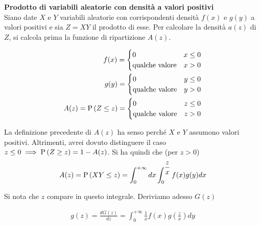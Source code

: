 \begin{defn}
    \textbf{Prodotto di variabili aleatorie con densità a valori positivi} \\
    Siano date $X$ e $Y$ variabili aleatorie con corrispondenti densità $f(x)$ e
    $g(y)$ a valori positivi e sia $Z = XY$ il prodotto di esse. Per calcolare
    la densità $a(z)$ di $Z$, si calcola prima la funzione di ripartizione $A(z)$.

    \begin{equation*}
        \begin{aligned}
            f(x) = \begin{cases}
                0 & x \leq 0 \\
                \text{qualche valore} & x > 0
            \end{cases} \\
            g(y) = \begin{cases}
                0 & y \leq 0 \\
                \text{qualche valore} & y > 0
            \end{cases} \\
            A(z) = \text{P}\left(Z \leq z\right) = \begin{cases}
                0 & z \leq 0 \\
                \text{qualche valore} & z > 0
            \end{cases}
        \end{aligned}
    \end{equation*}

    La definizione precedente di $A(z)$ ha senso perché $X$ e $Y$ assumono
    valori positivi. Altrimenti, avrei dovuto distinguere il caso $z \leq 0
    \implies \text{P}\left(Z \geq z\right) = 1 - A(z)$. Si ha quindi che (per $z > 0$)
    \begin{equation*}
        \begin{aligned}
            A(z) = \text{P}\left(XY \leq z\right) = \int_{0}^{+\infty} dx \int_{0}^{\dfrac{z}{x}} f(x) g(y) dx
        \end{aligned}
    \end{equation*}

    Si nota che $z$ compare in questo integrale. Deriviamo adesso $G(z)$

    \begin{equation*}
        \begin{aligned}
            g(z) = \frac{d G(z)}{dz} = \int_{0}^{+\infty} \frac{1}{x} f(x) g(\frac{z}{x}) dy
        \end{aligned}
    \end{equation*}
\end{defn}


